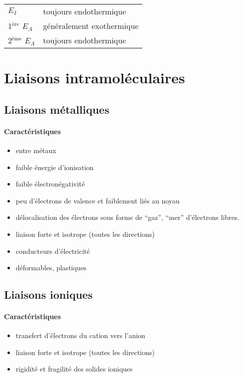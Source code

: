 \documentclass[11pt,a4paper,french]{article}
\begin{document}
\begin{center}
	\begin{tabular}{ll}
		$E_I$ & toujours endothermique\\
		1$^{\mathrm{ère}}$ $E_A$ & généralement exothermique\\
		2$^{\mathrm{ème}}$ $E_A$ & toujours endothermique
	\end{tabular}
\end{center}

\section{Liaisons intramoléculaires}

\subsection{Liaisons métalliques}
\paragraph{Caractéristiques}
\begin{itemize}
	\item entre métaux
	\item faible énergie d'ionisation
	\item faible électronégativité
	\item peu d'électrons de valence et faiblement liés au noyau
	\item délocalisation des électrons sous forme de ``gaz'', ``mer'' d'électrons libres.
	\item liaison forte et isotrope (toutes les directions)
	\item conducteurs d'électricité
	\item déformables, plastiques
\end{itemize}

\subsection{Liaisons ioniques}
\paragraph{Caractéristiques}
\begin{itemize}
	\item transfert d'électrons du cation vers l'anion
	\item liaison forte et isotrope (toutes les directions)
	\item rigidité et fragilité des solides ioniques
\end{itemize}
\end{document}
